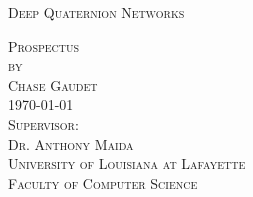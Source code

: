 ﻿%


\begin{titlepage}

\begin{center}

\Large
\textsc{Deep Quaternion Networks}\\

\vspace{4cm}

\textsc{Prospectus\\[0.5\baselineskip]
by\\[0.5\baselineskip]
Chase Gaudet}\\

\vspace{4cm}
\textsc{\today}\\ %

\vspace{1cm}
\textsc{Supervisor:\\
Dr. Anthony Maida}\\

\vspace{1cm}
\textsc{University of Louisiana at Lafayette\\
Faculty of Computer Science}\\

\end{center}

\end{titlepage}
